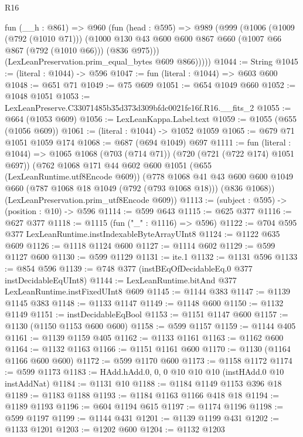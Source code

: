 \begin{lexlean}{R16}
\begin{coremodule}
      fun (__h : @861) =>
      @960
        (fun (head : @595) =>
        @989
          (@999
            (@1006
              (@1009 (@792 (@1010 @71)))
              (@1000 @130 @43 @600 @600 @867 @660 (@1007 @66 @867 (@792 (@1010 @66))) (@836 @975)))
            (LexLeanPreservation.prim_equal_bytes @609 @866)))))
@1044 := String
@1045 := (literal : @1044) -> @596
@1047 := fun (literal : @1044) => @603 @600
@1048 := @651 @71
@1049 := @75 @609
@1051 := @654 @1049 @660
@1052 := @1048 @1051
@1053 := LexLeanPreserve.C33071485b35d373d309bfdc0021fe16f.R16.__fits_2
@1055 := @664 (@1053 @609)
@1056 := LexLeanKappa.Label.text
@1059 := @1055 (@655 (@1056 @609))
@1061 := (literal : @1044) -> @1052 @1059
@1065 := @679 @71 @1051 @1059 @174
@1068 := @687 (@694 @1049) @697
@1111 := fun (literal : @1044) =>
  @1065
    @1068
    (@703 (@714 @71))
    (@720 (@721 (@722 @174) @1051 @697))
    (@762
      @1068
      @171
      @44
      @602
      @600
      @1051
      (@655 (LexLeanRuntime.utf8Encode @609))
      (@778
        @1068
        @41
        @43
        @600
        @600
        @1049
        @660
        (@787 @1068 @18 @1049 (@792 (@793 @1068 @18)))
        (@836 @1068))
      (LexLeanPreservation.prim_utf8Encode @609))
@1113 := (subject : @595) -> (position : @10) -> @596
@1114 := @599 @643
@1115 := @625 @377
@1116 := @627 @377
@1118 := @1115 (fun ("_" : @1116) => @596)
@1122 := @704 @595 @377 LexLeanRuntime.instIndexableByteArrayUInt8
@1124 := @1122 @635 @609
@1126 := @1118 @1124 @600
@1127 := @1114 @602
@1129 := @599 @1127 @600
@1130 := @599 @1129
@1131 := ite.{1}
@1132 := @1131 @596
@1133 := @854 @596
@1139 := @748 @377 (instBEqOfDecidableEq.{0} @377 instDecidableEqUInt8)
@1144 := LexLeanRuntime.bitAnd @377 LexLeanRuntime.instFixedUInt8 @609
@1145 := @1144 @383
@1147 := @1139 @1145 @383
@1148 := @1133 @1147
@1149 := @1148 @600
@1150 := @1132 @1149
@1151 := instDecidableEqBool
@1153 := @1151 @1147 @600
@1157 := @1130 (@1150 @1153 @600 @600)
@1158 := @599 @1157
@1159 := @1144 @405
@1161 := @1139 @1159 @405
@1162 := @1133 @1161
@1163 := @1162 @600
@1164 := @1132 @1163
@1166 := @1151 @1161 @600
@1170 := @1130 (@1164 @1166 @600 @600)
@1172 := @599 @1170 @600
@1173 := @1158 @1172
@1174 := @599 @1173
@1183 := HAdd.hAdd.{0, 0, 0} @10 @10 @10 (instHAdd.{0} @10 instAddNat)
@1184 := @1131 @10
@1188 := @1184 @1149 @1153 @396 @18
@1189 := @1183 @1188
@1193 := @1184 @1163 @1166 @418 @18
@1194 := @1189 @1193
@1196 := @604 @1194 @615
@1197 := @1174 @1196
@1198 := @599 @1197
@1199 := @1144 @431
@1201 := @1139 @1199 @431
@1202 := @1133 @1201
@1203 := @1202 @600
@1204 := @1132 @1203

\end{coremodule}
\end{lexlean}
